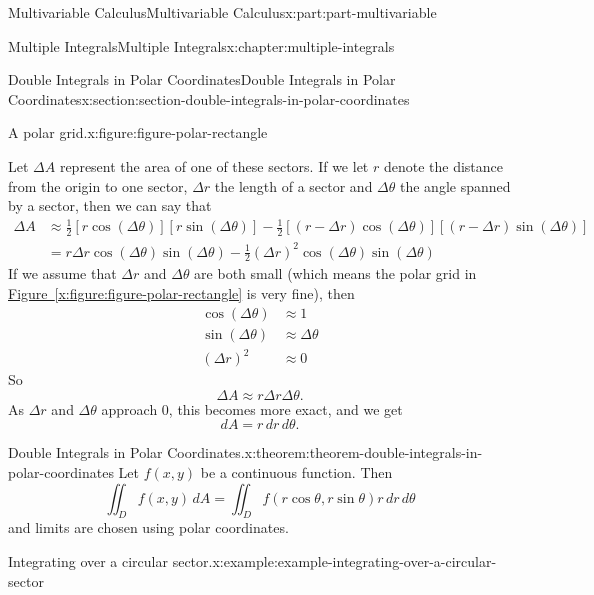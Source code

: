 \documentclass[twoside,10pt,]{tufte-book}
\newcommand{\xreffont}{\relax}
\numberwithin{equation}{part}
\begin{document}
\begin{partptx}{Multivariable Calculus}{}{Multivariable Calculus}{}{}{x:part:part-multivariable}
\begin{chapterptx}{Multiple Integrals}{}{Multiple Integrals}{}{}{x:chapter:multiple-integrals}
\begin{sectionptx}{Double Integrals in Polar Coordinates}{}{Double Integrals in Polar Coordinates}{}{}{x:section:section-double-integrals-in-polar-coordinates}
\begin{figureptx}{A polar grid.}{x:figure:figure-polar-rectangle}{}
\begin{image}{0}{1}{0}
{
}%
\end{image}%
\tcblower
\end{figureptx}%
%
\par
Let \(\Delta A\) represent the area of one of these sectors. If we let \(r\) denote the distance from the origin to one sector, \(\Delta r\) the length of a sector and \(\Delta\theta\) the angle spanned by a sector, then we can say that%
\begin{align*}
\Delta A & \approx \frac{1}{2}[r\cos(\Delta\theta)][r\sin(\Delta\theta)] - \frac{1}{2}[(r-\Delta r)\cos(\Delta\theta)][(r-\Delta r)\sin(\Delta\theta)] \\
& = r\Delta r\cos(\Delta\theta)\sin(\Delta\theta) - \frac{1}{2}(\Delta r)^{2}\cos(\Delta\theta)\sin(\Delta\theta)
\end{align*}
If we assume that \(\Delta r\) and \(\Delta\theta\) are both small (which means the polar grid in \hyperref[x:figure:figure-polar-rectangle]{Figure~{\xreffont\ref{x:figure:figure-polar-rectangle}}} is very fine), then%
\begin{align*}
\cos(\Delta\theta) & \approx 1 \\
\sin(\Delta\theta) & \approx \Delta\theta \\
(\Delta r)^{2} & \approx 0 
\end{align*}
So%
\begin{equation*}
\Delta A \approx r\Delta r\Delta\theta\text{.}
\end{equation*}
As \(\Delta r\) and \(\Delta\theta\) approach \(0\), this becomes more exact, and we get%
\begin{equation*}
dA = r\,dr\,d\theta\text{.}
\end{equation*}
%
\begin{theorem}{Double Integrals in Polar Coordinates.}{}{x:theorem:theorem-double-integrals-in-polar-coordinates}%
%
Let \(f(x,y)\) be a continuous function. Then%
\begin{equation*}
\iint_{D}f(x,y)\,dA = \iint_{D}f(r\cos\theta,r\sin\theta)r\,dr\,d\theta
\end{equation*}
and limits are chosen using polar coordinates.%
\end{theorem}
\begin{example}{Integrating over a circular sector.}{x:example:example-integrating-over-a-circular-sector}%

\end{example}
\end{sectionptx}
\end{chapterptx}
\end{partptx}
\end{document}
